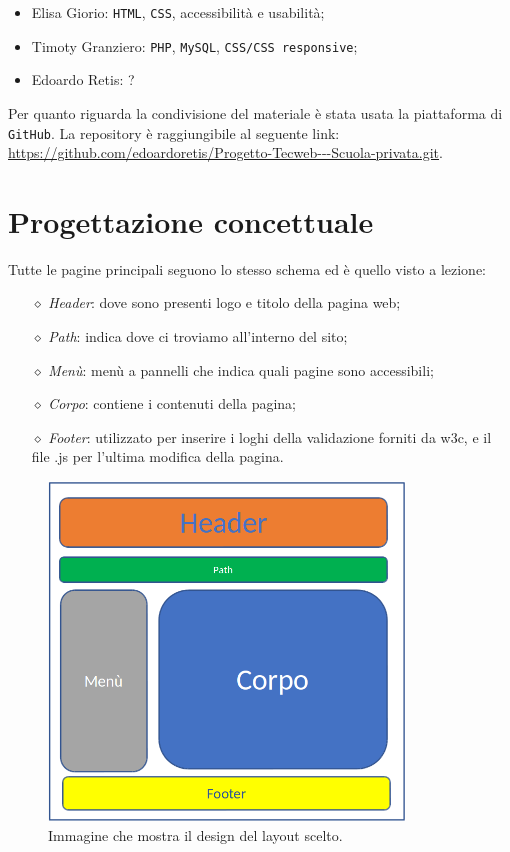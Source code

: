 \documentclass[12pt, a4paper]{article}
\renewcommand{\labelitemiii}{$\diamond$}
\begin{document}
\begin{itemize}
	\item Elisa Giorio: \texttt{HTML}, \texttt{CSS}, accessibilità e usabilità;
	\item Timoty Granziero: \texttt{PHP}, \texttt{MySQL}, \texttt{CSS/CSS responsive};
	\item Edoardo Retis: ?
\end{itemize}

Per quanto riguarda la condivisione del materiale è stata usata la piattaforma di \texttt{GitHub}. La 
repository è raggiungibile al seguente link: \url{https://github.com/edoardoretis/Progetto-Tecweb---Scuola-privata.git}.
 
\pagebreak %

\section{Progettazione concettuale}
Tutte le pagine principali seguono lo stesso schema ed è quello visto a lezione:
\begin{itemize}
	\item[\labelitemiii] \textit{Header}: dove sono presenti logo e titolo della pagina web;
	\item[\labelitemiii] \textit{Path}: indica dove ci troviamo all'interno del sito;
	\item[\labelitemiii] \textit{Menù}: menù a pannelli che indica quali pagine sono accessibili;
	\item[\labelitemiii] \textit{Corpo}: contiene i contenuti della pagina;
	\item[\labelitemiii] \textit{Footer}: utilizzato per inserire i loghi della validazione forniti da w3c, e il file .js per l’ultima modifica della pagina.
\end{itemize}

\begin{figure}[htb]
	\centering
	\includegraphics[height=9cm]{img/prog.png}
	\caption{Immagine che mostra il design del layout scelto.}	
\end{figure}
\end{document}
